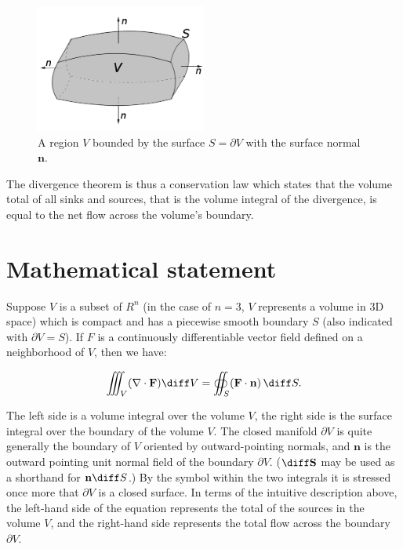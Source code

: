 \begin{figure}[htbp]
\centering
\includegraphics[width=0.5\textwidth]{Divergence_theorem.png} 
\caption{\label{fig:div_theorem}%
A region $V$ bounded by the surface $S=\partial V$ with the surface normal $\mathbf{n}$.}
\end{figure}

The divergence theorem is thus a conservation law which states that the volume
total of all sinks and sources, that is the volume integral of the divergence,
is equal to the net flow across the volume's boundary.

\section{Mathematical statement}
Suppose $V$ is a subset of $R^n$ (in the case of $n = 3$, $V$ represents a volume 
in 3D space) which is compact and has a piecewise smooth boundary $S$ 
(also indicated with $\partial V=S$). 
If $F$ is a continuously differentiable vector field defined on a neighborhood of $V$,
then we have:

\begin{equation}
  \iiint_V(\mathbf{\nabla}\cdot\mathbf{F}) \diff V =
  \oiint_S(\mathbf{F}\cdot\mathbf{n})\,\diff S.
\end{equation}

The left side is a volume integral over the volume $V$,
the right side is the surface integral over the boundary of the volume $V$.
The closed manifold $\partial V$ is quite generally the boundary of $V$
oriented by outward-pointing normals, and $\mathbf{n}$ is the outward pointing 
unit normal field of the boundary $\partial V$. 
($\diff \mathbf{S}$ may be used as a shorthand for $\mathbf{n} \diff S$.)
By the symbol within the two integrals it is stressed once more that $\partial V$
is a closed surface.
In terms of the intuitive description above, the left-hand side of the 
equation represents the total of the sources in the volume $V$, 
and the right-hand side represents the total flow across the boundary $\partial V$.

